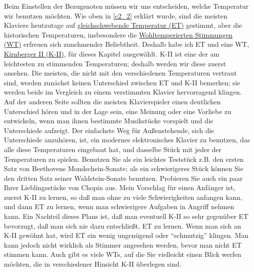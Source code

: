Beim Einstellen der Bezugsnoten müssen wir uns entscheiden, welche Temperatur wir benutzen möchten.
Wie oben in \hyperref[c2_2]{\autoref{c2_2}} erklärt wurde, sind die meisten Klaviere heutzutage auf \hyperref[et1]{gleichschwebende Temperatur (ET)} gestimmt, aber die historischen Temperaturen, insbesondere die \hyperref[c2_2_wtk2]{Wohltemperierten Stimmungen (WT)} erfreuen sich zunehmender Beliebtheit.
Deshalb habe ich ET und eine WT, \hyperref[c2_6_kirn]{Kirnberger II (K-II)}, für dieses Kapitel ausgewählt.
K-II ist eine der am leichtesten zu stimmenden Temperaturen; deshalb werden wir diese zuerst ansehen.
Die meisten, die nicht mit den verschiedenen Temperaturen vertraut sind, werden zunächst keinen Unterschied zwischen ET und K-II bemerken; sie werden beide im Vergleich zu einem verstimmten Klavier hervorragend klingen.
Auf der anderen Seite sollten die meisten Klavierspieler einen deutlichen Unterschied hören und in der Lage sein, eine Meinung oder eine Vorliebe zu entwickeln, wenn man ihnen bestimmte Musikstücke vorspielt und die Unterschiede aufzeigt.
Der einfachste Weg für Außenstehende, sich die Unterschiede anzuhören, ist, ein modernes elektronisches Klavier zu benutzen, das alle diese Temperaturen eingebaut hat, und dasselbe Stück mit jeder der Temperaturen zu spielen.
Benutzen Sie als ein leichtes Teststück z.B. den ersten Satz von Beethovens Mondschein-Sonate; als ein schwierigeres Stück können Sie den dritten Satz seiner Waldstein-Sonate benutzen.
Probieren Sie auch ein paar Ihrer Lieblingsstücke von Chopin aus.
Mein Vorschlag für einen Anfänger ist, zuerst K-II zu lernen, so daß man ohne zu viele Schwierigkeiten anfangen kann, und dann ET zu lernen, wenn man schwierigere Aufgaben in Angriff nehmen kann.
Ein Nachteil dieses Plans ist, daß man eventuell K-II so sehr gegenüber ET bevorzugt, daß man sich nie dazu entschließt, ET zu lernen.
Wenn man sich an K-II gewöhnt hat, wird ET ein wenig ungenügend oder \enquote{schmutzig} klingen.
Man kann jedoch nicht wirklich als Stimmer angesehen werden, bevor man nicht ET stimmen kann.
Auch gibt es viele WTs, auf die Sie vielleicht einen Blick werfen möchten, die in verschiedener Hinsicht K-II überlegen sind.

